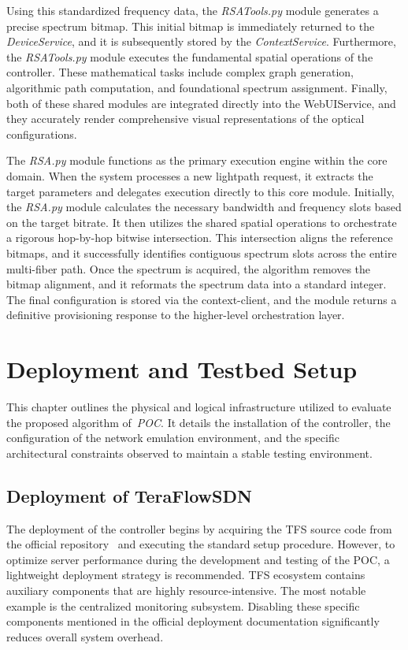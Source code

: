\documentclass[12pt, a4paper, twoside, openright]{report}
\begin{document}
Using this standardized frequency data, the \emph{RSATools.py} module generates a precise spectrum bitmap. This initial bitmap is immediately returned to the \emph{DeviceService}, and it is subsequently stored by the \emph{ContextService}. Furthermore, the \emph{RSATools.py} module executes the fundamental spatial operations of the controller. These mathematical tasks include complex graph generation, algorithmic path computation, and foundational spectrum assignment. Finally, both of these shared modules are integrated directly into the WebUIService, and they accurately render comprehensive visual representations of the optical configurations.

The \emph{RSA.py} module functions as the primary execution engine within the core domain. When the system processes a new lightpath request, it extracts the target parameters and delegates execution directly to this core module. Initially, the \emph{RSA.py} module calculates the necessary bandwidth and frequency slots based on the target bitrate. It then utilizes the shared spatial operations to orchestrate a rigorous hop-by-hop bitwise intersection. This intersection aligns the reference bitmaps, and it successfully identifies contiguous spectrum slots across the entire multi-fiber path. Once the spectrum is acquired, the algorithm removes the bitmap alignment, and it reformats the spectrum data into a standard integer. The final configuration is stored via the context-client, and the module returns a definitive provisioning response to the higher-level orchestration layer.

\chapter{Deployment and Testbed Setup}
This chapter outlines the physical and logical infrastructure utilized to evaluate the proposed algorithm of~\emph{POC}. It details the installation of the controller, the configuration of the network emulation environment, and the specific architectural constraints observed to maintain a stable testing environment.

\section{Deployment of TeraFlowSDN} \label{deployPOC}
The deployment of the controller begins by acquiring the TFS source code from the official repository~\cite{aboutTFS} and executing the standard setup procedure. However, to optimize server performance during the development and testing of the POC, a lightweight deployment strategy is recommended. TFS ecosystem contains auxiliary components that are highly resource-intensive. The most notable example is the centralized monitoring subsystem. Disabling these specific components mentioned in the official deployment documentation significantly reduces overall system overhead.
\end{document}
